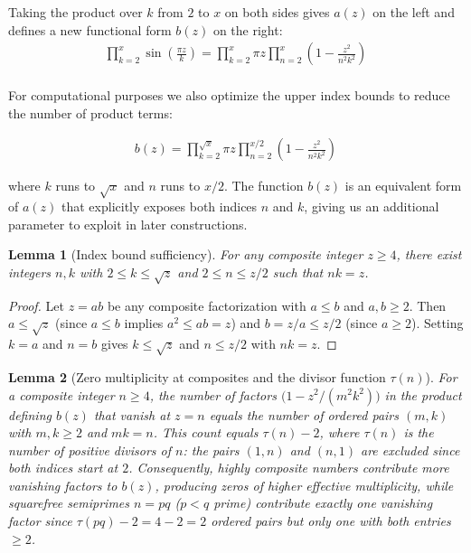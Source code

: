 \documentclass{article}
\newtheorem{lemma}{Lemma}
\begin{document}
Taking the product over $k$ from $2$ to $x$ on both sides gives $a(z)$ on the left and defines a new functional form $b(z)$ on the right:
\begin{align*}
	\prod_{k=2}^x\sin\left(\frac{\pi z}{k}\right) = \prod_{k=2}^x \pi z\prod_{n=2}^x \left(1-\frac{z^2}{n^2k^2}\right) \\
\end{align*}

For computational purposes we also optimize the upper index bounds to reduce the number of product terms:

\begin{align*}
	b(z) = \prod_{k=2}^{\sqrt{x}} \pi z\prod_{n=2}^{x/2} \left(1-\frac{z^2}{n^2k^2}\right)
\end{align*}

where $k$ runs to $\sqrt{x}$ and $n$ runs to $x/2$. The function $b(z)$ is an equivalent form of $a(z)$ that explicitly exposes both indices $n$ and $k$, giving us an additional parameter to exploit in later constructions.

\begin{lemma}[Index bound sufficiency]
For any composite integer $z \geq 4$, there exist integers $n, k$ with $2 \leq k \leq \sqrt{z}$ and $2 \leq n \leq z/2$ such that $nk = z$.
\end{lemma}
\begin{proof}
Let $z = ab$ be any composite factorization with $a \leq b$ and $a, b \geq 2$. Then $a \leq \sqrt{z}$ (since $a \leq b$ implies $a^2 \leq ab = z$) and $b = z/a \leq z/2$ (since $a \geq 2$). Setting $k = a$ and $n = b$ gives $k \leq \sqrt{z}$ and $n \leq z/2$ with $nk = z$.
\end{proof}

\begin{lemma}[Zero multiplicity at composites and the divisor function $\tau(n)$]
For a composite integer $n \geq 4$, the number of factors $\bigl(1 - z^2/(m^2k^2)\bigr)$ in the product defining $b(z)$ that vanish at $z = n$ equals the number of ordered pairs $(m,k)$ with $m,k \geq 2$ and $mk = n$. This count equals $\tau(n) - 2$, where $\tau(n)$ is the number of positive divisors of $n$: the pairs $(1,n)$ and $(n,1)$ are excluded since both indices start at $2$. Consequently, highly composite numbers contribute more vanishing factors to $b(z)$, producing zeros of higher effective multiplicity, while squarefree semiprimes $n = pq$ ($p < q$ prime) contribute exactly one vanishing factor since $\tau(pq) - 2 = 4 - 2 = 2$ ordered pairs but only one with both entries $\geq 2$.
\end{lemma}
\end{document}
